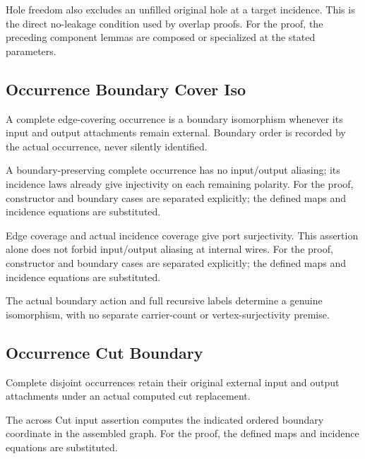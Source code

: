 Hole freedom also excludes an unfilled original hole at a target incidence. This is the direct no-leakage condition used by overlap proofs.
For the proof, the preceding component lemmas are composed or specialized at the stated parameters.
\par{}

\subsection{Occurrence Boundary Cover Iso}
A complete edge-covering occurrence is a boundary isomorphism whenever its input and output attachments remain external. Boundary order is recorded by the actual occurrence, never silently identified.

A boundary-preserving complete occurrence has no input/output aliasing; its incidence laws already give injectivity on each remaining polarity.
For the proof, constructor and boundary cases are separated explicitly; the defined maps and incidence equations are substituted.
\par{}

Edge coverage and actual incidence coverage give port surjectivity. This assertion alone does not forbid input/output aliasing at internal wires.
For the proof, constructor and boundary cases are separated explicitly; the defined maps and incidence equations are substituted.
\par{}

The actual boundary action and full recursive labels determine a genuine isomorphism, with no separate carrier-count or vertex-surjectivity premise.
\par{}

\subsection{Occurrence Cut Boundary}
Complete disjoint occurrences retain their original external input and output attachments under an actual computed cut replacement.

The across Cut input assertion computes the indicated ordered boundary coordinate in the assembled graph.
For the proof, the defined maps and incidence equations are substituted.
\par{}

